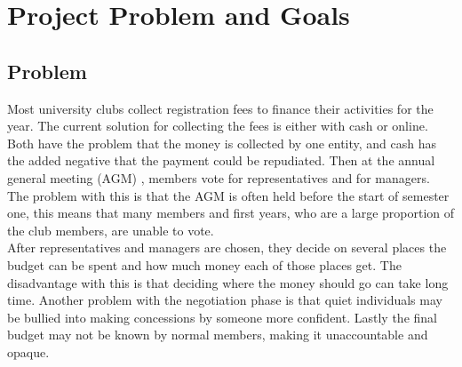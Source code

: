 \chapter{Project Problem and Goals} \label{Chapter: Project Problem and Goals}
\section{Problem}
Most university clubs collect registration fees to finance their activities for the year. The current solution for collecting the fees is either with cash or online. Both have the problem that the money is collected by one entity, and cash has the added negative that the payment could be repudiated. Then at the annual general meeting  (AGM) , members vote for representatives and for managers. The problem with this is that the AGM is often held before the start of semester one, this means that many members and first years, who are a large proportion of the club members, are unable to vote. 
\\
After representatives and managers are chosen, they decide on several places the budget can be spent and how much money each of those places get. The disadvantage with this is that deciding where the money should go can take long time. Another problem with the negotiation phase is that quiet individuals may be bullied into making concessions by someone more confident. Lastly the final budget may not be known by normal members, making it unaccountable and opaque.
